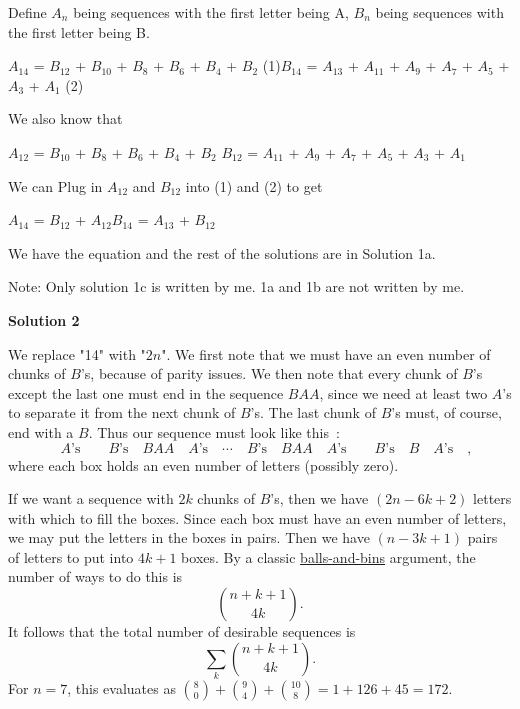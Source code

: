 \begin{enumerate}
Define $A_{n}$ being sequences with the first letter being A, $B_{n}$ being sequences with the first letter being B. 

 
$A_{14}$ = $B_{12}$ + $B_{10}$ + $B_{8}$ + $B_{6}$ + $B_{4}$ + $B_{2}$ (1)$B_{14}$ = $A_{13}$ + $A_{11}$ + $A_{9}$ + $A_{7}$ + $A_{5}$ + $A_{3}$ + $A_{1}$ (2)

 
We also know that 

 
$A_{12}$ = $B_{10}$ + $B_{8}$ + $B_{6}$ + $B_{4}$ + $B_{2}$ $B_{12}$ = $A_{11}$ + $A_{9}$ + $A_{7}$ + $A_{5}$ + $A_{3}$ + $A_{1}$

 
We can Plug in $A_{12}$ and $B_{12}$ into (1) and (2) to get

 
$A_{14}$ = $B_{12}$ + $A_{12}$$B_{14}$ = $A_{13}$ + $B_{12}$

 
We have the equation and the rest of the solutions are in Solution 1a.

 Note: Only solution 1c is written by me. 1a and 1b are not written by me.

 



\textbf{Solution 2}

We replace "14" with "$2n$". We first note that we must have an even number of chunks of $B$'s, because of parity issues.  We then note that every chunk of $B$'s except the last one must end in the sequence $BAA$, since we need at least two $A$'s to separate it from the next chunk of $B$'s. The last chunk of $B$'s must, of course, end with a $B$.  Thus our sequence must look like this :
 \[\boxed{\quad A\text{'s} \quad} \boxed{\quad B\text{'s} \quad} BAA \boxed{\quad A\text{'s} \quad} \cdots \boxed{\quad B\text{'s} \quad}BAA \boxed{\quad A\text{'s} \quad} \boxed{\quad B\text{'s} \quad} B \boxed{\quad A\text{'s} \quad} ,\]where each box holds an even number of letters (possibly zero).

 If we want a sequence with $2k$ chunks of $B$'s, then we have $(2n - 6k + 2)$ letters with which to fill the boxes. Since each box must have an even number of letters, we may put the letters in the boxes in pairs. Then we have $(n - 3k + 1)$ pairs of letters to put into $4k + 1$ boxes. By a classic \href{https://artofproblemsolving.com/wiki/index.php?title=Balls-and-bins}{balls-and-bins} argument, the number of ways to do this is
 \[\binom{n + k + 1}{4k} .\]It follows that the total number of desirable sequences is
 \[\sum_k \binom{n + k + 1}{4k} .\]For $n = 7$, this evaluates as $\binom{8}{0} + \binom{9}{4} + \binom{10}{8} = 1 + 126 + 45 = \boxed{172}$.


\end{enumerate}
